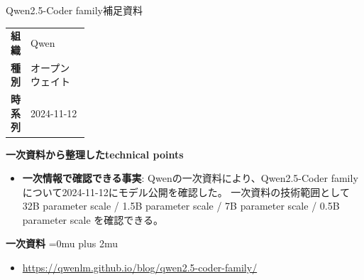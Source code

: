 \begin{technicalnote}{Qwen2.5-Coder family}{補足資料}
\begingroup
\begin{tabularx}{\linewidth}{@{}>{\bfseries}p{0.22\linewidth}X@{}}
組織 & Qwen \\
種別 & オープンウェイト \\
時系列 & 2024-11-12 \\
\end{tabularx}
\smallskip
{\bfseries 一次資料から整理したtechnical points}
\begin{itemize}[leftmargin=1.5em,itemsep=0.35em]
\item \textbf{一次情報で確認できる事実}: Qwenの一次資料により、Qwen2.5-Coder familyについて2024-11-12にモデル公開を確認した。 一次資料の技術範囲として 32B parameter scale / 1.5B parameter scale / 7B parameter scale / 0.5B parameter scale を確認できる。
\end{itemize}
\begin{minipage}{\linewidth}
\begin{samepage}
{\bfseries 一次資料}
\begingroup\sloppy
\Urlmuskip=0mu plus 2mu\relax
\begin{itemize}[leftmargin=1.5em,itemsep=0.25em]
\item {\scriptsize\url{https://qwenlm.github.io/blog/qwen2.5-coder-family/}}
\end{itemize}
\endgroup
\end{samepage}
\end{minipage}
\endgroup
\end{technicalnote}
\medskip

